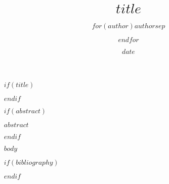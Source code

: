 \documentclass[nofonts]{tufte-handout}
\title{$title$}
\author{$for(author)$$author$$sep$ \and $endfor$}
\date{$date$}
\begin{document}
$if(title)$
\maketitle
$endif$

$if(abstract)$
\begin{fullwidth}
    \vskip10pt
    \hfill\textsf{$abstract$}
\end{fullwidth}
$endif$

$body$

$if(bibliography)$


$endif$
\end{document}
